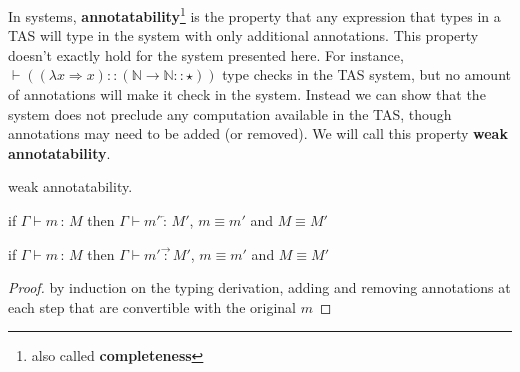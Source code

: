 In \Bidir{} systems, \textbf{annotatability}\footnote{also called \textbf{completeness}} is the property that any expression that types in a \ac{TAS} will type in the \bidir{} system with only additional annotations.
This property doesn't exactly hold for the \bidir{} system presented here.
For instance, $\vdash\left((\lambda x\Rightarrow x)::\left(\mathbb{N}\rightarrow\mathbb{N}::\star\right)\right)$ type checks in the \ac{TAS} system, but no amount of annotations will make it check in the \bidir{} system.
Instead we can show that the \bidir{} system does not preclude any computation available in the \ac{TAS}, though annotations may need to be added (or removed).%
We will call this property \textbf{weak annotatability}.
\begin{thm}
weak annotatability.
 
if $\Gamma\vdash m\,:\,M$ then $\Gamma\vdash m'\overleftarrow{\,:\,}M'$, $m\equiv m'$ and $M\equiv M'$
 
if $\Gamma\vdash m\,:\,M$ then $\Gamma\vdash m'\overrightarrow{\,:\,}M'$, $m\equiv m'$ and $M\equiv M'$
\end{thm}
 
\begin{proof}
by induction on the typing derivation, adding and removing annotations at each step that are convertible with the original $m$
\end{proof}
